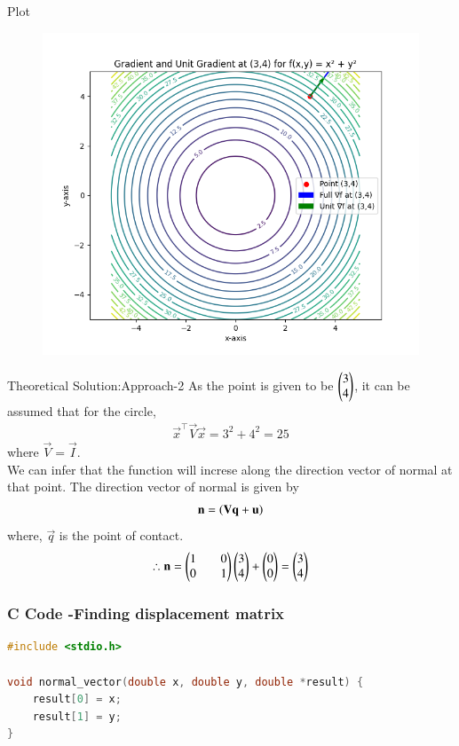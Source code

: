 \documentclass{beamer}
\begin{document}
\begin{frame}{Plot}
    \begin{figure}[H]
    \centering
    \includegraphics[width=0.8\columnwidth]{figs/Figure_1.png}
    \label{fig:1}
\end{figure}
\end{frame}

\begin{frame}{Theoretical Solution:Approach-2}
As the point is given to be $\begin{pmatrix}3\\4\end{pmatrix}$, it can be assumed that for the circle,
\begin{align}
    \vec{x}^{\top}\vec{V}\vec{x}=3^2+4^2=25 \label{eq:1}
\end{align}
where $\vec{V}=\vec{I}$.\\
We can infer that the function will increse along the direction vector of normal at that point.
The direction vector of normal is given by
\begin{align}
    \mathbf{n}=\left(\mathbf{V}\mathbf{q}+\mathbf{u}\right)
\end{align}
where, $\vec{q}$ is the point of contact.
\begin{align}
    \therefore \mathbf{n}=\begin{pmatrix}1&&0\\0&&1\end{pmatrix}\begin{pmatrix}3\\4\end{pmatrix}+\begin{pmatrix}0\\0\end{pmatrix}=\begin{pmatrix}3\\4\end{pmatrix}
\end{align}
\end{frame}


\begin{frame}[fragile]
    \frametitle{C Code -Finding displacement matrix}

    \begin{lstlisting}[language=C]
#include <stdio.h>

void normal_vector(double x, double y, double *result) {
    result[0] = x;
    result[1] = y;
}
    \end{lstlisting}
\end{frame}
\end{document}
